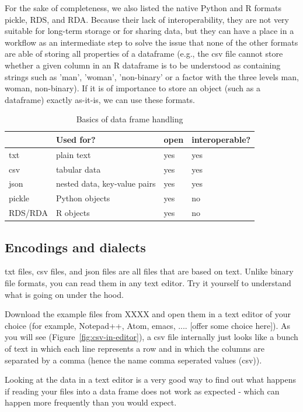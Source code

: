 For the sake of completeness, we also listed the native Python and R formats pickle, RDS, and RDA. Because their lack of interoperability, they are not very suitable for long-term storage or for sharing data, but they can have a place in a workflow as an intermediate step to solve the issue that none of the other formats are able of storing all properties of a dataframe (e.g., the csv file cannot store whether a given column in an R dataframe is to be understood as containing strings such as 'man', 'woman', 'non-binary' or a factor with the three levels man, woman, non-binary). If it is of importance to store an object (such as a dataframe) exactly as-it-is, we can use these formats. 

\begin{table}[]
\caption{Basics of data frame handling \label{tab:fileformats}}{%
\begin{tabular}{@{}llll@{}}
\toprule
        & Used for?             & open   & interoperable?\\ \midrule
txt     & plain text            &yes & yes            \\
csv     & tabular data          & yes & yes            \\
json    & nested data, key-value pairs   & yes & yes             \\ 
pickle  & Python objects        & yes & no     \\ 
RDS/RDA & R objects             & yes & no \\ \bottomrule
\end{tabular}}{}
\end{table}


\subsection{Encodings and dialects}
\label{sec:encodings}
txt files, csv files, and json files are all files that are based on text. Unlike binary file formats, you can read them in any text editor. Try it yourself to understand what is going on under the hood. 

Download the example files from XXXX and open them in a text editor of your choice (for example, Notepad++, Atom, emacs, .... [offer some choice here]). 
As you will see (Figure~\ref{fig:csv-in-editor}), a csv file internally just looks like a bunch of text in which each line represents a row and in which the columns are separated by a comma (hence the name comma seperated values (csv)).

Looking at the data in a text editor is a very good way to find out what happens if reading your files into a data frame does not work as expected - which can happen more frequently than you would expect.

